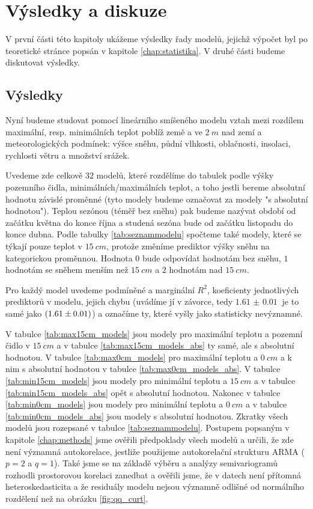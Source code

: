 \chapter{Výsledky a diskuze}\label{chap:ch3}
V první části této kapitoly ukážeme výsledky řady modelů, jejichž výpočet byl po teoretické stránce popsán v kapitole \ref{chap:statistika}. V druhé části budeme diskutovat výsledky.

\section{Výsledky}
Nyní budeme studovat pomocí lineárního smíšeného modelu vztah mezi rozdílem maximální, resp. minimálních teplot poblíž země a ve $\SI{2}{m}$ nad zemí a meteorologických podmínek: výšce sněhu, půdní vlhkosti, oblačnosti, insolaci, rychlosti větru a množství srážek.

Uvedeme zde celkově 32 modelů, které rozdělíme do tabulek podle výšky pozemního čidla, minimálních/maximálních teplot, a toho jestli bereme absolutní hodnotu závislé proměnné (tyto modely budeme označovat za modely "s absolutní hodnotou"). Teplou sezónou (téměř bez sněhu) pak budeme nazývat období od začátku května do konce října a studená sezóna bude od začátku listopadu do konce dubna. Podle tabulky \ref{tab:seznammodelu} spočteme také modely, které se týkají pouze teplot v $\SI{15}{cm}$, protože změníme prediktor výšky sněhu na kategorickou proměnnou. Hodnota $0$ bude odpovídat hodnotám bez sněhu, $1$ hodnotám se sněhem menším než $\SI{15}{cm}$ a $2$ hodnotám nad $\SI{15}{cm}$.

Pro každý model uvedeme podmíněné a marginální $R^2$, koeficienty jednotlivých prediktorů v modelu, jejich chybu (uvádíme jí v závorce, tedy $\SI{1.61(1)}{}$ je to samé jako $\SI[separate-uncertainty = true]{1.61\pm 0.01}{}$) a označíme ty, které vyšly jako statisticky nevýznamné.

V tabulce \ref{tab:max15cm_models} jsou modely pro maximální teplotu a pozemní čidlo v $\SI{15}{cm}$ a v tabulce \ref{tab:max15cm_models_abs} ty samé, ale s absolutní hodnotou. V tabulce \ref{tab:max0cm_models} pro maximální teplotu a $\SI{0}{cm}$ a k nim s absolutní hodnotou v tabulce \ref{tab:max0cm_models_abs}. V tabulce \ref{tab:min15cm_models} jsou modely pro minimální teplotu a $\SI{15}{cm}$ a v tabulce \ref{tab:min15cm_models_abs} opět s absolutní hodnotou. Nakonec v tabulce \ref{tab:min0cm_models} jsou modely pro minimální teplotu a $\SI{0}{cm}$ a v tabulce \ref{tab:min0cm_models_abs} jsou modely s absolutní hodnotou. Zkratky všech modelů jsou rozepsané v tabulce \ref{tab:seznammodelu}. Postupem popsaným v kapitole \ref{chap:methods} jsme ověřili předpoklady všech modelů a určili, že zde není významná autokorelace, jestliže použijeme autokorelační strukturu ARMA ($p=2$ a $q=1$). Také jsme se na základě výběru a analýzy semivariogramů rozhodli prostorovou korelaci zanedbat a ověřili jsme, že v datech není přítomná heteroskedasticita a že residuály modelu nejsou významně odlišné od normálního rozdělení než na obrázku \ref{fig:qq_curt}.

